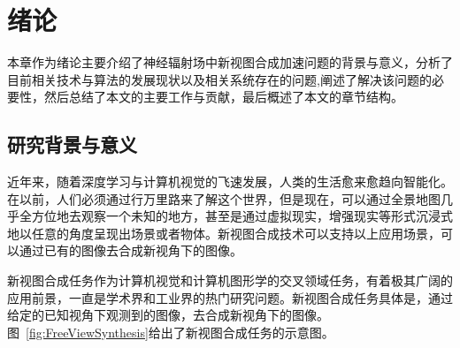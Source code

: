 
\chapter{绪论}

本章作为绪论主要介绍了神经辐射场中新视图合成加速问题的背景与意义，分析了目前相关技术与算法的发展现状以及相关系统存在的问题,阐述了解决该问题的必要性，然后总结了本文的主要工作与贡献，最后概述了本文的章节结构。

\section{研究背景与意义}
近年来，随着深度学习与计算机视觉的飞速发展，人类的生活愈来愈趋向智能化。在以前，人们必须通过行万里路来了解这个世界，但是现在，可以通过全景地图几乎全方位地去观察一个未知的地方，甚至是通过虚拟现实，增强现实等形式沉浸式地以任意的角度呈现出场景或者物体。新视图合成技术可以支持以上应用场景，可以通过已有的图像去合成新视角下的图像。

新视图合成任务\cite{chen1993view}作为计算机视觉和计算机图形学的交叉领域任务，有着极其广阔的应用前景，一直是学术界和工业界的热门研究问题。新视图合成任务具体是，通过给定的已知视角下观测到的图像，去合成新视角下的图像。图~\ref{fig:FreeViewSynthesis}给出了新视图合成任务的示意图。

